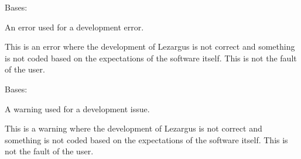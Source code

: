 \documentclass[letterpaper,11pt,english]{sphinxmanual}
\begin{document}
\begin{savenotes}\begin{fulllineitems}
\label{\detokenize{code/lezargus.library.logging:lezargus.library.logging.DevelopmentError}}
\pysigstartsignatures
{}
\pysigstopsignatures
\sphinxAtStartPar
Bases: {\hyperref[\detokenize{code/lezargus.library.logging:lezargus.library.logging.LezargusBaseError}]{}}

\sphinxAtStartPar
An error used for a development error.

\sphinxAtStartPar
This is an error where the development of Lezargus is not correct and
something is not coded based on the expectations of the software itself.
This is not the fault of the user.

\end{fulllineitems}\end{savenotes}


\begin{savenotes}\begin{fulllineitems}
\label{\detokenize{code/lezargus.library.logging:lezargus.library.logging.DevelopmentWarning}}
\pysigstartsignatures
{}
\pysigstopsignatures
\sphinxAtStartPar
Bases: {\hyperref[\detokenize{code/lezargus.library.logging:lezargus.library.logging.LezargusWarning}]{}}

\sphinxAtStartPar
A warning used for a development issue.

\sphinxAtStartPar
This is a warning where the development of Lezargus is not correct and
something is not coded based on the expectations of the software itself.
This is not the fault of the user.

\end{fulllineitems}\end{savenotes}

\end{document}
